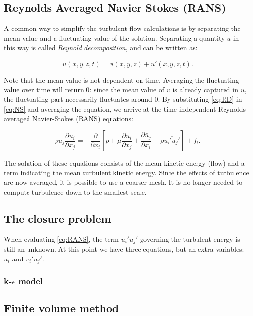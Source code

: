 \subsection{Reynolds Averaged Navier Stokes (RANS)}
A common way to simplify the turbulent flow calculations is by separating the mean value and a fluctuating value of the solution. Separating a quantity $u$ in this way is called \textit{Reynold decomposition}, and can be written as:

\begin{equation}\label{eq:RD}
u(x,y,z,t) = \overline{u(x,y,z)}+u'(x,y,z,t).
\end{equation}

Note that the mean value is not dependent on time. Averaging the fluctuating value over time will return 0: since the mean value of $u$ is already captured in $\bar{u}$, the fluctuating part necessarily fluctuates around 0. By substituting \autoref{eq:RD} in \autoref{eq:NS} and averaging the equation, we arrive at the time independent Reynolds averaged Navier-Stokes (RANS) equations:

\begin{equation}\label{eq:RANS}
\rho \bar{u}_j \frac{\partial \bar{u}_i}{\partial x_j} = -\frac{\partial}{\partial x_i} \left[ \bar{p} + \mu \frac{\partial \bar{u}_i}{\partial x_j} + \frac{\partial \bar{u}_j}{\partial x_i} - \rho \overline{u_i'u_j'}\right] + f_i. 
\end{equation} 

The solution of these equations consists of the mean kinetic energy (flow) and a term indicating the mean turbulent kinetic energy. Since the effects of turbulence are now averaged, it is possible to use a coarser mesh. It is no longer needed to compute turbulence down to the smallest scale. 

\subsection{The closure problem}
When evaluating \autoref{eq:RANS}, the term $\overline{u_i'u_j'}$ governing the turbulent energy is still an unknown. At this point we have three equations, but an extra variables: $u_i$ and $\overline{u_i'u_j'}$. 

\subsubsection{k-$\epsilon$ model}

\subsection{Finite volume method}

